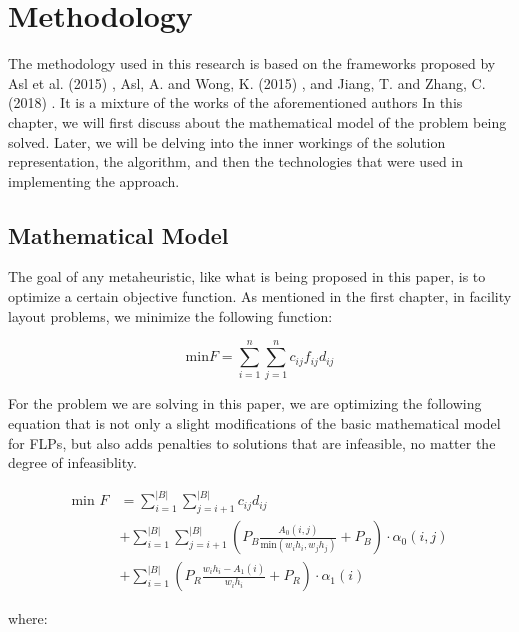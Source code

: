 \chapter{Methodology}
The methodology used in this research is based on the frameworks proposed by Asl et al. (2015) \cite{Asl2015}, Asl, A. and Wong, K. (2015) \cite{Asl2015a}, and Jiang, T. and Zhang, C. (2018) \cite{Jiang2018}. It is a mixture of the works of the aforementioned authors 
In this chapter, we will first discuss about the mathematical model of the problem being solved. Later, we will be delving into the inner workings of the solution representation, the algorithm, and then the technologies that were used in implementing the approach.

\section{Mathematical Model}
The goal of any metaheuristic, like what is being proposed in this paper, is to optimize a certain objective function. As mentioned in the first chapter, in facility layout problems, we minimize the following function:

$$
\text{min} F = \sum_{i=1}^{n}\sum_{j=1}^{n}c_{ij}f_{ij}d_{ij}
$$

For the problem we are solving in this paper, we are optimizing the following equation that is not only a slight modifications of the basic mathematical model for FLPs, but also adds penalties to solutions that are infeasible, no matter the degree of infeasiblity.

\begin{align*}
	\text{min }F &= \sum_{i=1}^{\left | B \right |}\sum_{j=i + 1}^{\left | B \right |}c_{ij}d_{ij} \\
	& + \sum_{i=1}^{\left | B \right |}\sum_{j=i + 1}^{\left | B \right |} \left ( P_{B}\frac{A_{0}(i, j)}{\text{min}(w_{i}h_{i}, w_{j}h_{j})} + P_{B} \right ) \cdot \alpha_{0}(i, j) \\
	& + \sum_{i=1}^{\left | B \right |}\left( P_{R}\frac{w_{i}h_{i} - A_{1}(i)}{w_{i}h_{i}} + P_{R} \right) \cdot \alpha_{1}(i)
\end{align*}

where:


